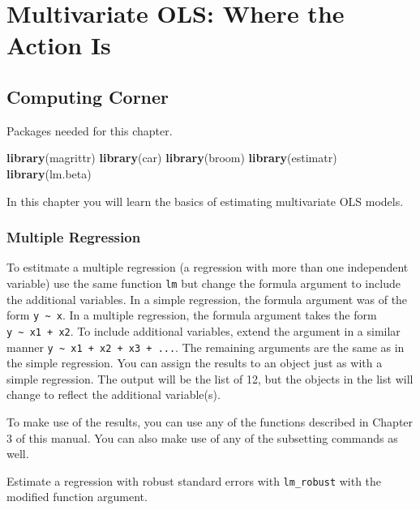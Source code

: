 \documentclass[]{book}
\newenvironment{Shaded}{\begin{snugshade}}{\end{snugshade}}
\newcommand{\KeywordTok}[1]{\textcolor[rgb]{0.13,0.29,0.53}{\textbf{#1}}}
\newcommand{\NormalTok}[1]{#1}
\begin{document}
\hypertarget{chp5}{%
\chapter{Multivariate OLS: Where the Action Is}\label{chp5}}

\hypertarget{computing-corner-1}{%
\section{Computing Corner}\label{computing-corner-1}}

Packages needed for this chapter.

\begin{Shaded}
\begin{Highlighting}[]
\KeywordTok{library}\NormalTok{(magrittr)}
\KeywordTok{library}\NormalTok{(car)}
\KeywordTok{library}\NormalTok{(broom)}
\KeywordTok{library}\NormalTok{(estimatr)}
\KeywordTok{library}\NormalTok{(lm.beta)}
\end{Highlighting}
\end{Shaded}

In this chapter you will learn the basics of estimating multivariate OLS models.

\hypertarget{multiple-regression}{%
\subsection{Multiple Regression}\label{multiple-regression}}

To estitmate a multiple regression (a regression with more than one independent variable) use the same function \texttt{lm} but change the formula argument to include the additional variables. In a simple regression, the formula argument was of the form \texttt{y\ \textasciitilde{}\ x}. In a multiple regression, the formula argument takes the form \texttt{y\ \textasciitilde{}\ x1\ +\ x2}. To include additional variables, extend the argument in a similar manner \texttt{y\ \textasciitilde{}\ x1\ +\ x2\ +\ x3\ +\ ...}. The remaining arguments are the same as in the simple regression. You can assign the results to an object just as with a simple regression. The output will be the list of 12, but the objects in the list will change to reflect the additional variable(s).

To make use of the results, you can use any of the functions described in Chapter 3 of this manual. You can also make use of any of the subsetting commands as well.

Estimate a regression with robust standard errors with \texttt{lm\_robust} with the modified function argument.
\end{document}
